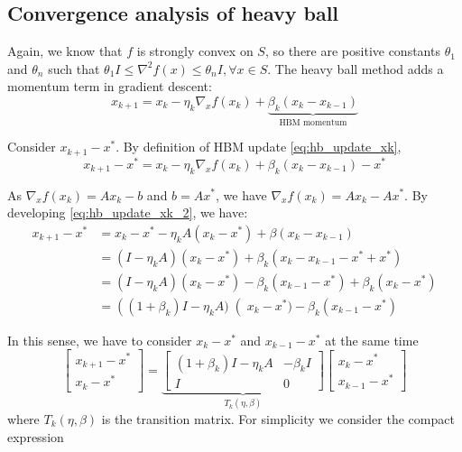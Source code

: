 \subsection{Convergence analysis of heavy ball}
\label{subsec:hbm_convergence}
Again, we know that $f$ is strongly convex on $S$, so there are positive constants $\theta_1$ and $\theta_n$ such that $\theta_1I \leq \nabla^{2}f(x) \leq \theta_nI, \forall x \in S$. The heavy ball method adds a momentum term in gradient descent:
\begin{equation}
    x_{k+1} = x_{k} - \eta_{k} \nabla_{x} f(x_k) + \underbrace{\beta_k (x_k - x_{k-1})}_{\text{HBM  momentum}}
    \label{eq:hb_update_xk}
\end{equation}

\noindent Consider $x_{k+1} - x^*$. By definition of HBM update \eqref{eq:hb_update_xk}, 
\begin{equation}
    x_{k+1} - x^* = x_{k} - \eta_{k} \nabla_{x} f(x_k) + \beta_k (x_k - x_{k-1}) - x^*
    \label{eq:hb_update_xk_2}
\end{equation}

\noindent As $\nabla_x f(x_k) = Ax_k - b$ and $b = Ax^*$, we have $\nabla_x f(x_k) = Ax_k - Ax^*$. By developing \eqref{eq:hb_update_xk_2}, we have:
\begin{equation}
\begin{aligned}
x_{k+1} - x^* &= x_k - x^* - \eta_k A(x_k - x^*) + \beta(x_k - x_{k-1}) \\
& = (I - \eta_k A)(x_k - x^*) + \beta_k (x_k - x_{k-1} -x^* + x^*) \\
& = (I - \eta_k A)(x_k - x^*) - \beta_k (x_{k-1} - x^*) + \beta_k (x_k - x^*)\\
&= \left((1+\beta_k)I-\eta_k A)\right(x_k - x^*) - \beta_k (x_{k-1} - x^*)
\end{aligned}
\end{equation}

\noindent In this sense, we have to consider $x_k - x^*$ and $x_{k-1} - x^* $ at the same time
\begin{equation}
\begin{bmatrix}
x_{k+1} - x^*\\
x_k - x^*
\end{bmatrix} 
=
\underbrace{\begin{bmatrix}
(1+\beta_k)I - \eta_k A & - \beta_kI\\
I & 0
\end{bmatrix}}_{T_k (\eta, \beta)}
\begin{bmatrix}
x_{k} - x^*\\
x_{k-1} - x^*
\end{bmatrix}
\end{equation}
where $T_k (\eta, \beta)$ is the transition matrix. For simplicity we consider the compact expression

